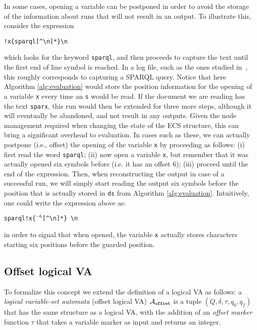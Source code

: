 
In some cases, opening a variable can be postponed in order to avoid the storage
of the information about runs that will not result in an output. To illustrate
this, consider the expression
\begin{center}
	\texttt{!x\{sparql[\textasciicircum \textbackslash n]*\}\textbackslash n}
\end{center}
which looks for the keyword \texttt{sparql}, and then proceeds to capture the
text until the first end of line symbol is reached. In a log file, such as the
ones studied in~\citet{AMRV16}, this roughly corresponds to capturing a SPARQL
query. Notice that here Algorithm \ref{alg:evaluation} would store the position
information for the opening of a variable \texttt{x} every time an \texttt{s}
would be read. If the document we are reading has the text \texttt{sparx}, this
run would then be extended for three more steps, although it will eventually be
abandoned, and not result in any outputs. Given the node management required
when changing the state of the ECS structure, this can bring a significant
overhead to evaluation. In cases such as these, we can actually postpone (i.e.,
offset) the opening of the variable \texttt{x} by proceeding as follows: (i)
first read the word \texttt{sparql}; (ii) now open a variable \texttt{x}, but
remember that it was actually opened six symbols before (i.e. it has an offset
6); (iii) proceed until the end of the expression. Then, when reconstructing the
output in case of a successful run, we will simply start reading the output six
symbols before the position that is actually stored in \texttt{ds} from
Algorithm \ref{alg:evaluation}. Intuitively, one could write the expression
above as:
\begin{center}
	\texttt{sparql!x\{$^{-6}$[\textasciicircum \textbackslash n]*\}
	\textbackslash n} 
\end{center}
in order to signal that when opened, the variable \texttt{x} actually stores
characters starting six positions before the guarded position.

\subsection{Offset logical VA} 
To formalize this concept we extend the definition of a logical VA as follows: a
\emph{logical variable-set automata} (offset logical VA) $\mathcal{A}_{\texttt{offset}}$ is a tuple
$(Q, \delta, \tau, q_0, q_f)$ that has the same structure as a logical VA, with
the addition of an \emph{offset marker} function $\tau$ that takes a variable
marker as input and returns an integer.


